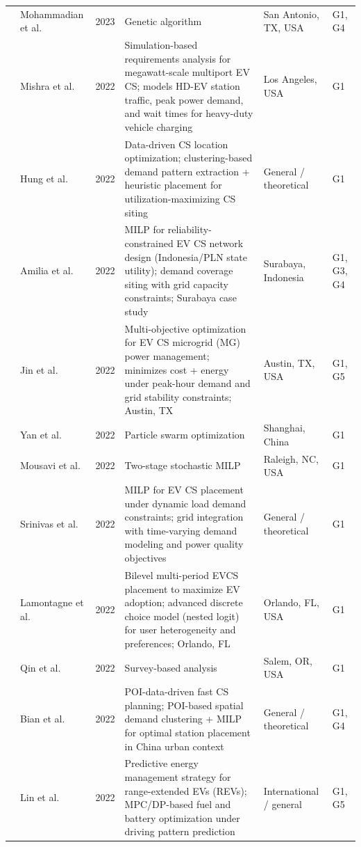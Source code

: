 \documentclass[letterpaper, 12pt, oneside, doublespacing]{Thesis}
\begin{document}
\begin{longtable}{L{0.9cm} L{2.2cm} L{0.8cm} L{3.3cm} L{2.5cm} L{1.5cm}}
\cite{spatial_arbitrage_2023} & Mohammadian et al. & 2023 & Genetic algorithm & San Antonio, TX, USA & G1, G4 \\
\cite{a_framework_2022} & Mishra et al. & 2022 & Simulation-based requirements analysis for megawatt-scale multiport EV CS; models HD-EV station traffic, peak power demand, and wait times for heavy-duty vehicle charging & Los Angeles, USA & G1 \\
\cite{a_novel_2022} & Hung et al. & 2022 & Data-driven CS location optimization; clustering-based demand pattern extraction + heuristic placement for utilization-maximizing CS siting & General {\slash} theoretical & G1 \\
\cite{designing_an_2022} & Amilia et al. & 2022 & MILP for reliability-constrained EV CS network design (Indonesia/PLN state utility); demand coverage siting with grid capacity constraints; Surabaya case study & Surabaya, Indonesia & G1, G3, G4 \\
\cite{development_of_2022} & Jin et al. & 2022 & Multi-objective optimization for EV CS microgrid (MG) power management; minimizes cost + energy under peak-hour demand and grid stability constraints; Austin, TX & Austin, TX, USA & G1, G5 \\
\cite{distributed_coordination_2022} & Yan et al. & 2022 & Particle swarm optimization & Shanghai, China & G1 \\
\cite{ev_charging_2022} & Mousavi et al. & 2022 & Two-stage stochastic MILP & Raleigh, NC, USA & G1 \\
\cite{optimal_placement_2022} & Srinivas et al. & 2022 & MILP for EV CS placement under dynamic load demand constraints; grid integration with time-varying demand modeling and power quality objectives & General {\slash} theoretical & G1 \\
\cite{optimising_electric_2022} & Lamontagne et al. & 2022 & Bilevel multi-period EVCS placement to maximize EV adoption; advanced discrete choice model (nested logit) for user heterogeneity and preferences; Orlando, FL & Orlando, FL, USA & G1 \\
\cite{performance_analysis_2022} & Qin et al. & 2022 & Survey-based analysis & Salem, OR, USA & G1 \\
\cite{planning_of_2022} & Bian et al. & 2022 & POI-data-driven fast CS planning; POI-based spatial demand clustering + MILP for optimal station placement in China urban context & General {\slash} theoretical & G1, G4 \\
\cite{predictive_energy_2022} & Lin et al. & 2022 & Predictive energy management strategy for range-extended EVs (REVs); MPC/DP-based fuel and battery optimization under driving pattern prediction & International {\slash} general & G1, G5 \\

\end{longtable}
\end{document}
